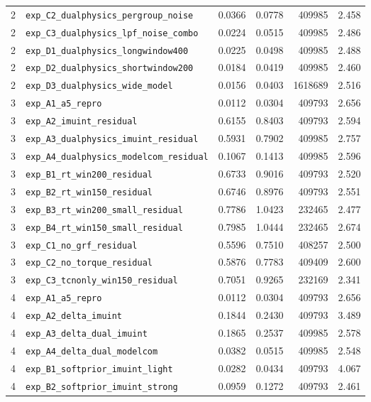 \begin{longtable}{r l r r r r}
2 & \texttt{exp\_C2\_dualphysics\_pergroup\_noise} & 0.0366 & 0.0778 & 409985 & 2.458 \\
2 & \texttt{exp\_C3\_dualphysics\_lpf\_noise\_combo} & 0.0224 & 0.0515 & 409985 & 2.486 \\
2 & \texttt{exp\_D1\_dualphysics\_longwindow400} & 0.0225 & 0.0498 & 409985 & 2.488 \\
2 & \texttt{exp\_D2\_dualphysics\_shortwindow200} & 0.0184 & 0.0419 & 409985 & 2.460 \\
2 & \texttt{exp\_D3\_dualphysics\_wide\_model} & 0.0156 & 0.0403 & 1618689 & 2.516 \\
3 & \texttt{exp\_A1\_a5\_repro} & 0.0112 & 0.0304 & 409793 & 2.656 \\
3 & \texttt{exp\_A2\_imuint\_residual} & 0.6155 & 0.8403 & 409793 & 2.594 \\
3 & \texttt{exp\_A3\_dualphysics\_imuint\_residual} & 0.5931 & 0.7902 & 409985 & 2.757 \\
3 & \texttt{exp\_A4\_dualphysics\_modelcom\_residual} & 0.1067 & 0.1413 & 409985 & 2.596 \\
3 & \texttt{exp\_B1\_rt\_win200\_residual} & 0.6733 & 0.9016 & 409793 & 2.520 \\
3 & \texttt{exp\_B2\_rt\_win150\_residual} & 0.6746 & 0.8976 & 409793 & 2.551 \\
3 & \texttt{exp\_B3\_rt\_win200\_small\_residual} & 0.7786 & 1.0423 & 232465 & 2.477 \\
3 & \texttt{exp\_B4\_rt\_win150\_small\_residual} & 0.7985 & 1.0444 & 232465 & 2.674 \\
3 & \texttt{exp\_C1\_no\_grf\_residual} & 0.5596 & 0.7510 & 408257 & 2.500 \\
3 & \texttt{exp\_C2\_no\_torque\_residual} & 0.5876 & 0.7783 & 409409 & 2.600 \\
3 & \texttt{exp\_C3\_tcnonly\_win150\_residual} & 0.7051 & 0.9265 & 232169 & 2.341 \\
4 & \texttt{exp\_A1\_a5\_repro} & 0.0112 & 0.0304 & 409793 & 2.656 \\
4 & \texttt{exp\_A2\_delta\_imuint} & 0.1844 & 0.2430 & 409793 & 3.489 \\
4 & \texttt{exp\_A3\_delta\_dual\_imuint} & 0.1865 & 0.2537 & 409985 & 2.578 \\
4 & \texttt{exp\_A4\_delta\_dual\_modelcom} & 0.0382 & 0.0515 & 409985 & 2.548 \\
4 & \texttt{exp\_B1\_softprior\_imuint\_light} & 0.0282 & 0.0434 & 409793 & 4.067 \\
4 & \texttt{exp\_B2\_softprior\_imuint\_strong} & 0.0959 & 0.1272 & 409793 & 2.461 \\

\end{longtable}
